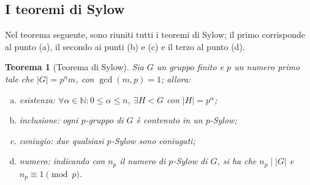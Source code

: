 \documentclass[12pt]{scrartcl}
\theoremstyle{style}
\newtheorem{teorema}{Teorema}[section]
\numberwithin{equation}{subsection}
\begin{document}
\subsection{I teoremi di Sylow}
Nel teorema seguente, sono riuniti tutti i teoremi di Sylow; il primo corrisponde al punto (a), il secondo ai punti (b) e (c) e il terzo al punto (d).
\begin{teorema}
	[Teorema di Sylow]
	Sia $G$ un gruppo finito e $p$ un numero primo tale che $\lvert G \rvert =p^n m$, con $\operatorname{gcd}(m,p) =1$; allora:
	\begin{enumerate}[(a).]
		\item \textit{esistenza}: $\forall \alpha \in \mathbb{N} : 0\le \alpha \le n, \ \exists H < G$ con $\lvert H \rvert = p^\alpha $;
		\item \textit{inclusione}: ogni $p$-gruppo di $G$ \`e contenuto in un $p$-Sylow;
		\item \textit{coniugio}: due qualsiasi $p$-Sylow sono coniugati;
		\item \textit{numero}: indicando con $n_p$ il numero di $p$-Sylow di $G$, si ha che $n_p  \mid |G|$ e $n_p \equiv 1 \pmod{p} $.
	\end{enumerate}
\end{teorema}
\end{document}
